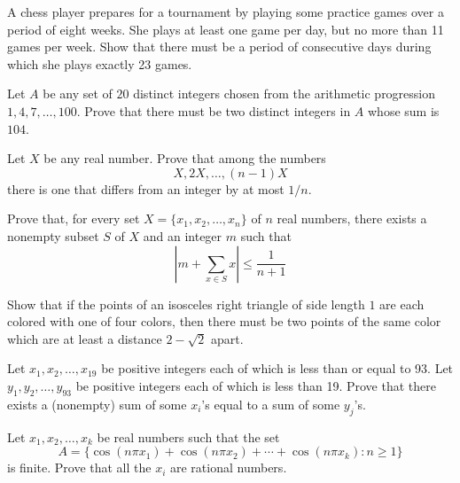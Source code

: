 \documentclass{article}
\begin{document}
\begin{exercise}
    A chess player prepares for a tournament by playing some practice games over a period of eight weeks. 
    She plays at least one game per day, but no more than 11 games per week. 
    Show that there must be a period of consecutive days during which she plays exactly 23 games.
\end{exercise}

\begin{exercise} %
    Let $A$ be any set of $20$ distinct integers chosen from the arithmetic progression $1,4,7,\dots, 100$. Prove that there must be two distinct integers in $A$ whose sum is $104$.
\end{exercise}

\begin{exercise}
    Let \(X\) be any real number. Prove that among the numbers 
    \[X,2X,\dots,(n-1)X\] 
    there is one that differs from an integer by at most \(1/n\).
\end{exercise}

\begin{exercise}[2006 B2]
    Prove that, for every set \(X=\{x_1,x_2,\dots,x_n\}\) of \(n\) real numbers, there exists a nonempty subset \(S\) of \(X\) and an integer \(m\) such that 
    \[\left|m+\sum_{x\in S} x\right| \leq \frac{1}{n+1}\]
\end{exercise}
    
\begin{exercise}[1994 A3]
    Show that if the points of an isosceles right triangle of side length $1$ are each colored with one of four colors, then there must be two points of the same color which are at least a distance \(2-\sqrt{2}\) apart. 
\end{exercise}
    
\begin{exercise}[1993 A4]
    Let \(x_1,x_2,\dots,x_{19}\) be positive integers each of which is less than or equal to 93. 
    Let \(y_1,y_2,\dots,y_{93}\) be positive integers each of which is less than 19. 
    Prove that there exists a (nonempty) sum of some \(x_{i}\)'s equal to a sum of some \(y_j\)'s.
\end{exercise}

\begin{exercise}
    Let \(x_1,x_2,\dots,x_k\) be real numbers such that the set 
    \[A=\{\cos(n\pi x_1)+\cos(n\pi x_2)+\cdots+\cos(n\pi x_k) : n\geq 1\}\] 
    is finite. Prove that all the \(x_i\) are rational numbers.
\end{exercise}
\end{document}
